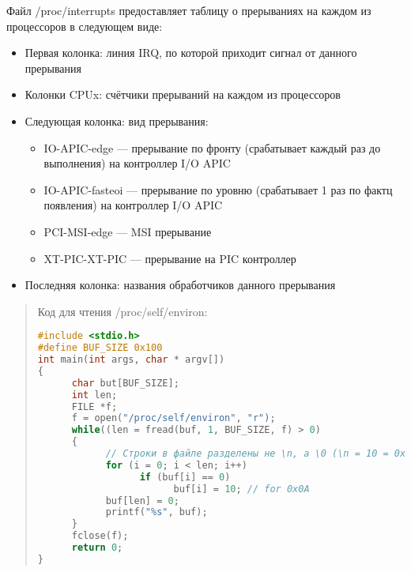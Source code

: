 Файл /proc/interrupts предоставляет таблицу о прерываниях на каждом из процессоров в следующем виде:
\begin{itemize}
\item Первая колонка: линия IRQ, по которой приходит сигнал от данного прерывания
\item Колонки CPUx: счётчики прерываний на каждом из процессоров
\item Следующая колонка: вид прерывания:
\begin{itemize}
     \item IO-APIC-edge — прерывание по фронту (срабатывает каждый раз до выполнения) на контроллер I/O APIC
    \item IO-APIC-fasteoi — прерывание по уровню (срабатывает 1 раз по фактц появления) на контроллер I/O APIC
    \item PCI-MSI-edge — MSI прерывание
    \item XT-PIC-XT-PIC — прерывание на PIC контроллер
\end{itemize}
\item Последняя колонка: названия обработчиков данного прерывания
\end{itemize}

\begin{quote}
Код для чтения /proc/self/environ:
\begin{lstlisting}[language=C, label=lst:1, caption=код для чтения /proc/self/environ]
#include <stdio.h>
#define BUF_SIZE 0x100
int main(int args, char * argv[])
{
      char but[BUF_SIZE];
      int len;
      FILE *f;
      f = open("/proc/self/environ", "r");
      while((len = fread(buf, 1, BUF_SIZE, f) > 0)
      {
            // Строки в файле разделены не \n, а \0 (\n = 10 = 0x0A)
            for (i = 0; i < len; i++)
                  if (buf[i] == 0)
                        buf[i] = 10; // for 0x0A
            buf[len] = 0;
            printf("%s", buf);
      }
      fclose(f);
      return 0;
}
\end{lstlisting}
\end{quote}

